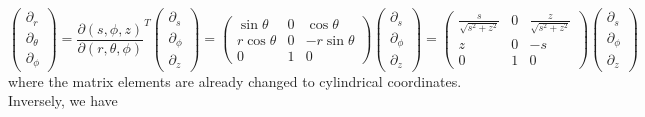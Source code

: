 \begin{equation}\label{eqn:diff-sph-to-diff-cyl}
    \begin{pmatrix} \partial_r \\ \partial_\theta \\ \partial_\phi \end{pmatrix} 
    = \frac{\partial(s, \phi, z)}{\partial (r, \theta, \phi)}^T
    \begin{pmatrix} \partial_s \\ \partial_\phi \\ \partial_z \end{pmatrix} 
    = \begin{pmatrix}
        \sin\theta & 0 & \cos\theta \\ 
        r\cos\theta & 0 & -r\sin\theta \\ 
        0 & 1 & 0
    \end{pmatrix} \begin{pmatrix} \partial_s \\ \partial_\phi \\ \partial_z \end{pmatrix}
    = \begin{pmatrix}
        \frac{s}{\sqrt{s^2 + z^2}} & 0 & \frac{z}{\sqrt{s^2 + z^2}} \\ 
        z & 0 & -s \\ 
        0 & 1 & 0
    \end{pmatrix} \begin{pmatrix} \partial_s \\ \partial_\phi \\ \partial_z \end{pmatrix}
\end{equation}
where the matrix elements are already changed to cylindrical coordinates. Inversely, we have
